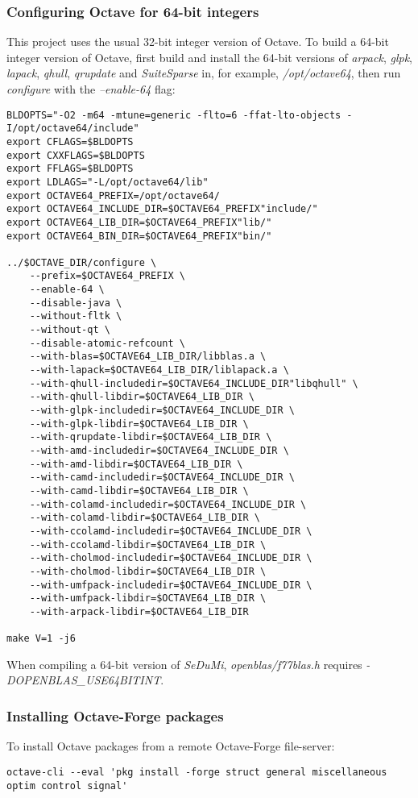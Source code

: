\documentclass[a4paper,twoside,10pt,english]{report}
\begin{document}
\subsubsection*{Configuring Octave for 64-bit integers}
This project uses the usual 32-bit integer version of Octave.
To build a 64-bit integer version of Octave, first build and install the 
64-bit versions of \emph{arpack}, \emph{glpk}, \emph{lapack}, \emph{qhull}, 
\emph{qrupdate} and \emph{SuiteSparse} in, for example, \emph{/opt/octave64},
then run \emph{configure} with the \emph{--enable-64} flag:
\begin{small}
\begin{verbatim}
BLDOPTS="-O2 -m64 -mtune=generic -flto=6 -ffat-lto-objects -I/opt/octave64/include"
export CFLAGS=$BLDOPTS 
export CXXFLAGS=$BLDOPTS 
export FFLAGS=$BLDOPTS
export LDLAGS="-L/opt/octave64/lib"
export OCTAVE64_PREFIX=/opt/octave64/
export OCTAVE64_INCLUDE_DIR=$OCTAVE64_PREFIX"include/"
export OCTAVE64_LIB_DIR=$OCTAVE64_PREFIX"lib/"
export OCTAVE64_BIN_DIR=$OCTAVE64_PREFIX"bin/"

../$OCTAVE_DIR/configure \
    --prefix=$OCTAVE64_PREFIX \
    --enable-64 \
    --disable-java \
    --without-fltk \
    --without-qt \
    --disable-atomic-refcount \
    --with-blas=$OCTAVE64_LIB_DIR/libblas.a \
    --with-lapack=$OCTAVE64_LIB_DIR/liblapack.a \
    --with-qhull-includedir=$OCTAVE64_INCLUDE_DIR"libqhull" \
    --with-qhull-libdir=$OCTAVE64_LIB_DIR \
    --with-glpk-includedir=$OCTAVE64_INCLUDE_DIR \
    --with-glpk-libdir=$OCTAVE64_LIB_DIR \
    --with-qrupdate-libdir=$OCTAVE64_LIB_DIR \
    --with-amd-includedir=$OCTAVE64_INCLUDE_DIR \
    --with-amd-libdir=$OCTAVE64_LIB_DIR \
    --with-camd-includedir=$OCTAVE64_INCLUDE_DIR \
    --with-camd-libdir=$OCTAVE64_LIB_DIR \
    --with-colamd-includedir=$OCTAVE64_INCLUDE_DIR \
    --with-colamd-libdir=$OCTAVE64_LIB_DIR \
    --with-ccolamd-includedir=$OCTAVE64_INCLUDE_DIR \
    --with-ccolamd-libdir=$OCTAVE64_LIB_DIR \
    --with-cholmod-includedir=$OCTAVE64_INCLUDE_DIR \
    --with-cholmod-libdir=$OCTAVE64_LIB_DIR \
    --with-umfpack-includedir=$OCTAVE64_INCLUDE_DIR \
    --with-umfpack-libdir=$OCTAVE64_LIB_DIR \
    --with-arpack-libdir=$OCTAVE64_LIB_DIR

make V=1 -j6
\end{verbatim}
\end{small}
When compiling a 64-bit version of \emph{SeDuMi}, \emph{openblas/f77blas.h} 
requires \emph{-DOPENBLAS\_USE64BITINT}. 
\subsubsection*{Installing Octave-Forge packages}
To install Octave packages from a remote Octave-Forge file-server:
\begin{small}
\begin{verbatim}
octave-cli --eval 'pkg install -forge struct general miscellaneous optim control signal'
\end{verbatim}
\end{small}
\end{document}
